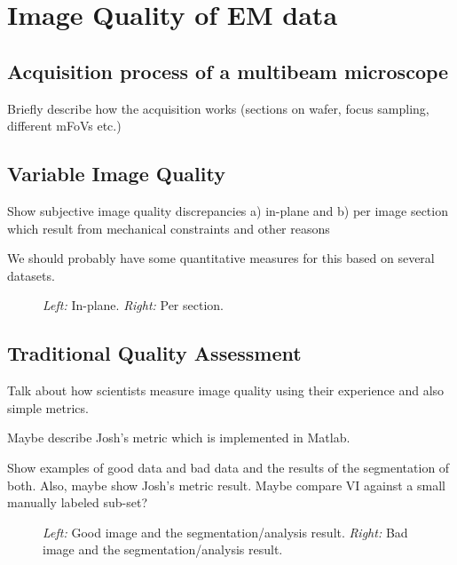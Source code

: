 \documentclass{llncs}
\begin{document}
\section{Image Quality of EM data}

\subsection{Acquisition process of a multibeam microscope}

Briefly describe how the acquisition works (sections on wafer, focus sampling, different mFoVs etc.)

\subsection{Variable Image Quality}

Show subjective image quality discrepancies a) in-plane and b) per image section which result from mechanical constraints and other reasons

We should probably have some quantitative measures for this based on several datasets.

\begin{figure}
\caption{\emph{Left:} In-plane. \emph{Right:} Per section.}
\end{figure}

\subsection{Traditional Quality Assessment}

Talk about how scientists measure image quality using their experience and also simple metrics.

Maybe describe Josh's metric which is implemented in Matlab.

Show examples of good data and bad data and the results of the segmentation of both. Also, maybe show Josh's metric result. Maybe compare VI against a small manually labeled sub-set?

\begin{figure}
\caption{\emph{Left:} Good image and the segmentation/analysis result. \emph{Right:} Bad image and the segmentation/analysis result.}
\end{figure}
\end{document}
